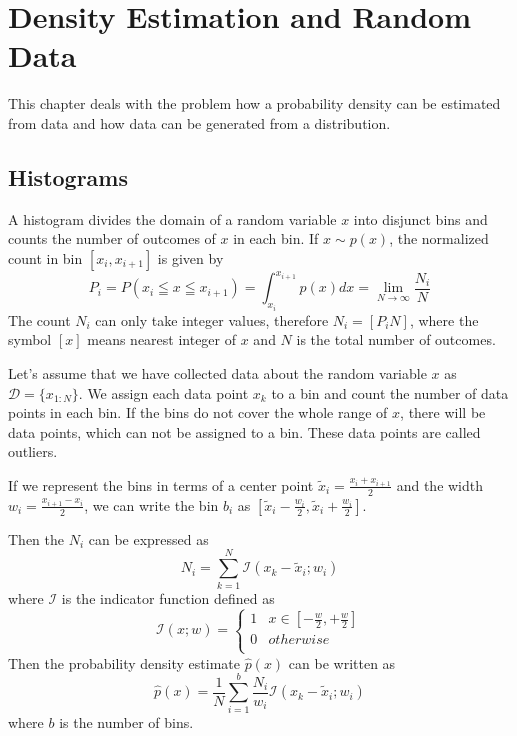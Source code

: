 \documentclass{tstextbook}
\begin{document}
\chapter{Density Estimation and Random Data}

\begin{summary}
  This chapter deals with the problem how a probability density can be estimated from data and how data can be generated from a distribution.
\end{summary}

\section{Histograms}
\label{Histograms}

A histogram divides the domain of a random variable $x$ into disjunct bins and counts the number of outcomes of $x$ in each bin. If $x\sim p(x)$, the normalized count in bin $[x_i,x_{i+1}]$ is given by
  \begin{equation}
    P_i=P\left(x_i\leqq x\leqq x_{i+1}\right)=\int_{x_i}^{x_{i+1}}p(x)dx=\lim_{N\rightarrow\infty}\frac{N_i}{N}
  \end{equation}
The count $N_i$ can only take integer values, therefore $N_i = [P_i N]$, where the symbol $[x]$ means nearest integer of $x$ and $N$ is the total number of outcomes.

Let's assume that we have collected data about the random variable $x$ as $\mathcal{D}=\{x_{1:N}\}$. We assign each data point $x_k$ to a bin and count the number of data points in each bin. If the bins do not cover the whole range of $x$, there will be data points, which can not be assigned to a bin. These data points are called outliers.  

If we represent the bins in terms of a center point $\tilde{x}_i=\frac{x_i + x_{i+1}}{2}$ and the width $w_i=\frac{x_{i+1}-x_i}{2}$, we can write the bin $b_i$ as $[\tilde{x}_i-\frac{w_i}{2},\tilde{x}_i+\frac{w_i}{2}]$.

Then the $N_i$ can be expressed as
  \begin{equation}
    N_i=\sum_{k=1}^{N}\mathcal{I}\left(x_k-\tilde{x}_i;w_i\right)
  \end{equation}
where $\mathcal{I}$ is the indicator function defined as
  \begin{equation}
    \mathcal{I}(x;w)=\begin{cases}1 & x\in [-\frac{w}{2},+\frac{w}{2}] \\
0 & otherwise \\
\end{cases}
  \end{equation}
Then the probability density estimate $\hat{p}(x)$ can be written as
  \begin{equation}
    \hat{p}(x)=\frac{1}{N}\sum_{i=1}^{b}\frac{N_i}{w_i}\mathcal{I}\left(x_k-\tilde{x}_i;w_i\right)
  \end{equation}
  where $b$ is the number of bins.
  
\end{document}
